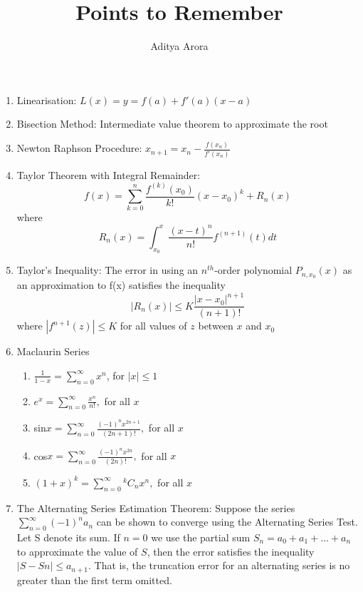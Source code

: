 \documentclass[12pt]{article}
\newcommand*{\Co}[2]{{}^{#1}C_{#2}}%
\begin{document}
 
\title{Points to Remember}%
\author{Aditya Arora} %
\maketitle


\begin{enumerate}
\item Linearisation: $L(x) = y = f(a) + f'(a)(x-a)$
\item Bisection Method: Intermediate value theorem to approximate the root
\item Newton Raphson Procedure: $x_{n+1} = x_{n} - \frac{f(x_{n})}{f'(x_{n})}$
\item Taylor Theorem with Integral Remainder: $$f(x) = \sum_{k=0}^n \frac{f^{(k)}(x_0)}{k!}(x-x_0)^k + R_n(x)$$ 
where $$ R_n(x) = \int_{x_0}^x\frac{(x-t)^n}{n!}f^{(n+1)}(t) dt$$
\item Taylor's Inequality: The error in using an $n^{th}$-order polynomial $P_{n,x_0}(x)$ as an approximation to f(x) satisfies the inequality 
$$|R_n(x)| \leq K\frac{|x-x_0|^{n+1}}{(n+1)!}$$ where $|f^{n+1}(z)| \leq K$ for all values of $z$ between $x$ and $x_0$
\item Maclaurin Series
    \begin{enumerate}
        \parskip=0in
        \parsep=0in
        \itemsep=0.15in
    \item $\frac{1}{1-x} = \sum_{n=0}^{\infty}x^{n}$, for $|x| \le 1$
    \item $e^x = \sum_{n=0}^{\infty}\frac{x^{n}}{n!},$ for all $x$
    \item sin$x = \sum_{n=0}^{\infty}\frac{(-1)^n x^{2n+1}}{(2n+1)!},$ for all $x$
    \item cos$x = \sum_{n=0}^{\infty}\frac{(-1)^n x^{2n}}{(2n)!},$ for all $x$
    \item $(1+x)^k = \sum_{n=0}^{\infty}\Co{k}{n}x^{n},$ for all $x$
    \end{enumerate}
\item The Alternating Series Estimation Theorem:
Suppose the series $\sum_{n=0}^\infty (-1)^na_n$ can be shown to converge using the Alternating Series Test. Let S denote its sum. If $n=0$
we use the partial sum $S_n = a_0 + a_1 + . . . + a_n$ to approximate the value of $S$, then the error satisfies the inequality $|S-Sn| \leq a_{n+1}$. That is, the truncation error for an alternating series is no greater than the first term omitted.\newpage 

\end{enumerate}
\end{document}
